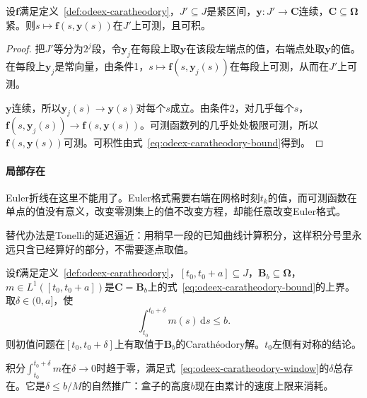 \begin{lemma}[沿连续曲线的可测性]
\label{lem:odeex-composition-measurable}
设$\bm{f}$满足定义~\ref{def:odeex-caratheodory}，$J'\subseteq J$是紧区间，$\bm{y}:J'\to\bm{C}$连续，$\bm{C}\subseteq\bm{\Omega}$紧。则$s\mapsto\bm{f}(s,\bm{y}(s))$在$J'$上可测，且可积。
\end{lemma}

\begin{proof}
把$J'$等分为$2^j$段，令$\bm{y}_j$在每段上取$\bm{y}$在该段左端点的值，右端点处取$\bm{y}$的值。在每段上$\bm{y}_j$是常向量，由条件1，$s\mapsto\bm{f}(s,\bm{y}_j(s))$在每段上可测，从而在$J'$上可测。

$\bm{y}$连续，所以$\bm{y}_j(s)\to\bm{y}(s)$对每个$s$成立。由条件2，对几乎每个$s$，$\bm{f}(s,\bm{y}_j(s))\to\bm{f}(s,\bm{y}(s))$。可测函数列的几乎处处极限可测，所以$\bm{f}(s,\bm{y}(s))$可测。可积性由式~\eqref{eq:odeex-caratheodory-bound}得到。
\end{proof}

\paragraph{局部存在}
Euler折线在这里不能用了。Euler格式需要右端在网格时刻$t_k$的值，而可测函数在单点的值没有意义，改变零测集上的值不改变方程，却能任意改变Euler格式。

替代办法是Tonelli的延迟逼近：用稍早一段的已知曲线计算积分，这样积分号里永远只含已经算好的部分，不需要逐点取值。

\begin{theorem}[Carathéodory存在定理]
\label{thm:odeex-caratheodory-existence}
设$\bm{f}$满足定义~\ref{def:odeex-caratheodory}，$[t_0,t_0+a]\subseteq J$，$\bm{B}_b\subseteq\bm{\Omega}$，$m\in L^1([t_0,t_0+a])$是$\bm{C}=\bm{B}_b$上的式~\eqref{eq:odeex-caratheodory-bound}的上界。取$\delta\in(0,a]$，使
\begin{equation}
 \int_{t_0}^{t_0+\delta}m(s)\,\mathrm{d}s\leq b.
 \label{eq:odeex-caratheodory-window}
\end{equation}
则初值问题在$[t_0,t_0+\delta]$上有取值于$\bm{B}_b$的Carathéodory解。$t_0$左侧有对称的结论。
\end{theorem}

积分$\int_{t_0}^{t_0+\delta}m$在$\delta\to0$时趋于零，满足式~\eqref{eq:odeex-caratheodory-window}的$\delta$总存在。它是$\delta\leq b/M$的自然推广：盒子的高度$b$现在由累计的速度上限来消耗。

